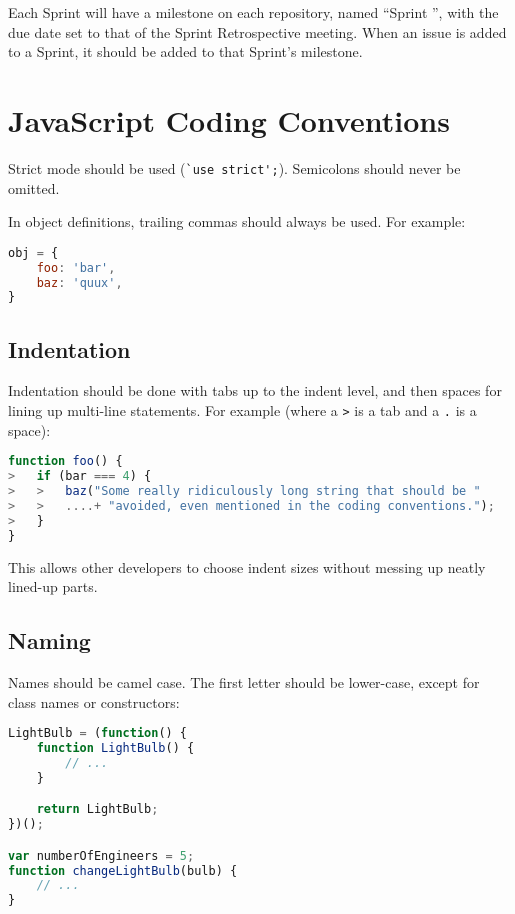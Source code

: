 Each Sprint will have a milestone on each repository, named ``Sprint '',
with the due date set to that of the Sprint Retrospective meeting. When
an issue is added to a Sprint, it should be added to that Sprint's
milestone.

\section{JavaScript Coding Conventions}

Strict mode should be used (\lstinline|`use strict';|). Semicolons should
never be omitted.

In object definitions, trailing commas should always be used. For
example:

\begin{lstlisting}[language=javascript]
obj = {
    foo: 'bar',
    baz: 'quux',
}
\end{lstlisting}

\subsection{Indentation}

Indentation should be done with tabs up to the indent level, and then
spaces for lining up multi-line statements. For example (where a
\texttt{\textgreater{}} is a tab and a \texttt{.} is a space):

\begin{lstlisting}[language=javascript]
function foo() {
>   if (bar === 4) {
>   >   baz("Some really ridiculously long string that should be "
>   >   ....+ "avoided, even mentioned in the coding conventions.");
>   }
}
\end{lstlisting}

This allows other developers to choose indent sizes without messing up
neatly lined-up parts.

\subsection{Naming}

Names should be camel case. The first letter should be lower-case,
except for class names or constructors:

\begin{lstlisting}[language=javascript]
LightBulb = (function() {
    function LightBulb() {
        // ...
    }

    return LightBulb;
})();

var numberOfEngineers = 5;
function changeLightBulb(bulb) {
    // ...
}
\end{lstlisting}

